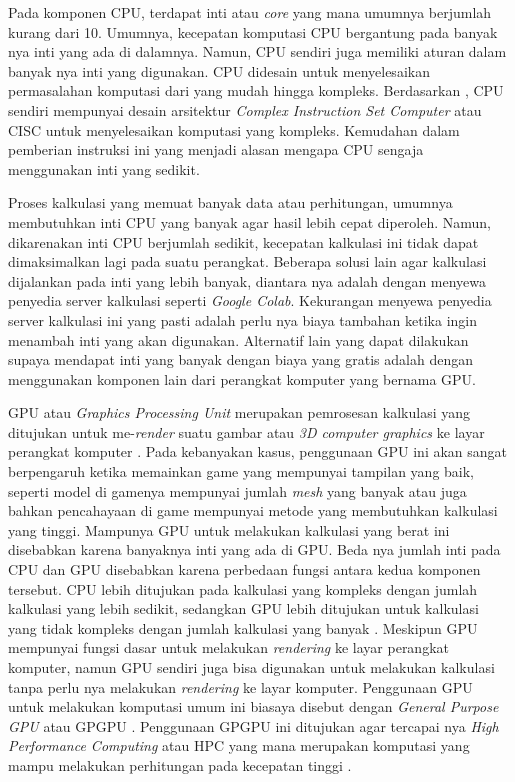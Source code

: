 
Pada komponen CPU, terdapat inti atau \emph{core} yang mana umumnya berjumlah
kurang dari 10. Umumnya, kecepatan komputasi CPU bergantung pada banyak nya
inti yang ada di dalamnya. Namun, CPU sendiri juga memiliki aturan dalam banyak
nya inti yang digunakan. CPU didesain untuk menyelesaikan permasalahan
komputasi dari yang mudah hingga kompleks. Berdasarkan
\cite{kukunasChapterIntelPentium2015}, CPU sendiri mempunyai desain arsitektur
\emph{Complex Instruction Set Computer} atau CISC untuk menyelesaikan komputasi
yang kompleks. Kemudahan dalam pemberian instruksi ini yang menjadi alasan
mengapa CPU sengaja menggunakan inti yang sedikit.

Proses kalkulasi yang memuat banyak data atau perhitungan, umumnya membutuhkan
inti CPU yang banyak agar hasil lebih cepat diperoleh. Namun, dikarenakan inti
CPU berjumlah sedikit, kecepatan kalkulasi ini tidak dapat dimaksimalkan lagi
pada suatu perangkat. Beberapa solusi lain agar kalkulasi dijalankan pada inti
yang lebih banyak, diantara nya adalah dengan menyewa penyedia server kalkulasi
seperti \emph{Google Colab}. Kekurangan menyewa penyedia server kalkulasi ini
yang pasti adalah perlu nya biaya tambahan ketika ingin menambah inti yang akan
digunakan. Alternatif lain yang dapat dilakukan supaya mendapat inti yang
banyak dengan biaya yang gratis adalah dengan menggunakan komponen lain dari
perangkat komputer yang bernama GPU.


GPU atau \emph{Graphics Processing Unit} merupakan pemrosesan kalkulasi yang
ditujukan untuk me-\emph{render} suatu gambar atau \emph{3D computer graphics}
ke layar perangkat komputer \citep{armWhatGraphicsProcessing2023}. Pada
kebanyakan kasus, penggunaan GPU ini akan sangat berpengaruh ketika memainkan
game yang mempunyai tampilan yang baik, seperti model di gamenya mempunyai
jumlah \emph{mesh} yang banyak atau juga bahkan pencahayaan di game mempunyai
metode yang membutuhkan kalkulasi yang tinggi. Mampunya GPU untuk melakukan
kalkulasi yang berat ini disebabkan karena banyaknya inti yang ada di GPU. Beda
nya jumlah inti pada CPU dan GPU disebabkan karena perbedaan fungsi antara
kedua komponen tersebut. CPU lebih ditujukan pada kalkulasi yang kompleks
dengan jumlah kalkulasi yang lebih sedikit, sedangkan GPU lebih ditujukan untuk
kalkulasi yang tidak kompleks dengan jumlah kalkulasi yang banyak
\citep{intelCPUVsGPU2023}. Meskipun GPU mempunyai fungsi dasar untuk melakukan
\emph{rendering} ke layar perangkat komputer, namun GPU sendiri juga bisa
digunakan untuk melakukan kalkulasi tanpa perlu nya melakukan \emph{rendering}
ke layar komputer. Penggunaan GPU untuk melakukan komputasi umum ini biasaya
disebut dengan \emph{General Purpose GPU} atau GPGPU
\citep{gigabyteWhatGPGPUWhy2023}. Penggunaan GPGPU ini ditujukan agar tercapai
nya \emph{High Performance Computing} atau HPC yang mana merupakan komputasi
yang mampu melakukan perhitungan pada kecepatan tinggi
\citep{gigabyteHPCHighPerformance2023}.

